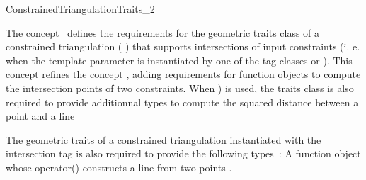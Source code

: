 

\begin{ccRefConcept}{ConstrainedTriangulationTraits_2}


\ccDefinition
  
The concept \ccRefName\ defines the requirements for the geometric
traits class of a constrained triangulation
( )
that supports intersections of input constraints (i. e.
when the template parameter  is instantiated
by one of the tag classes  or
). This concept refines the concept
, adding requirements for function objects
to compute the intersection points of two constraints.
When ) is used, the 
traits class is
also required to provide  additionnal types
to compute the squared distance between a point and a line


\ccRefines
{} 


\ccTypes


The geometric traits of a  constrained triangulation instantiated with
the intersection tag 
is also required to provide the following types~:
\ccGlue
{} {A function object whose operator()
constructs a line from two points
.}
\ccGlue
{}



\end{ccRefConcept}
